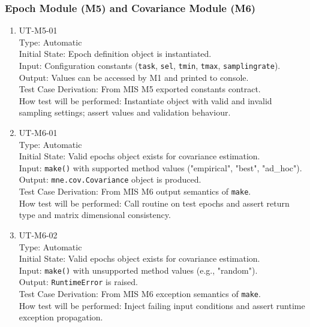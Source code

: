 \documentclass[12pt, titlepage]{article}
\begin{document}
\subsubsection{Epoch Module (M5) and Covariance Module (M6)}

\begin{enumerate}

\item{UT-M5-01\\}
    Type: Automatic \\
    Initial State: Epoch definition object is instantiated. \\
    Input: Configuration constants (\lstinline|task|, \lstinline|sel|, \lstinline|tmin|, \lstinline|tmax|, \lstinline|samplingrate|). \\
    Output: Values can be accessed by M1 and printed to console. \\
    Test Case Derivation: From MIS M5 exported constants contract. \\
    How test will be performed: Instantiate object with valid and invalid sampling settings; assert values and validation behaviour.

\item{UT-M6-01\\}
    Type: Automatic \\
    Initial State: Valid epochs object exists for covariance estimation. \\
    Input: \lstinline|make()| with supported method values ("empirical", "best", "ad\_hoc"). \\
    Output: \lstinline|mne.cov.Covariance| object is produced. \\
    Test Case Derivation: From MIS M6 output semantics of \lstinline|make|. \\
    How test will be performed: Call routine on test epochs and assert return type and matrix dimensional consistency.

\item{UT-M6-02\\}
    Type: Automatic \\
    Initial State: Valid epochs object exists for covariance estimation. \\
    Input: \lstinline|make()| with unsupported method values (e.g., "random"). \\
    Output: \lstinline|RuntimeError| is raised. \\
    Test Case Derivation: From MIS M6 exception semantics of \lstinline|make|. \\
    How test will be performed: Inject failing input conditions and assert runtime exception propagation.
\end{enumerate}
\end{document}
